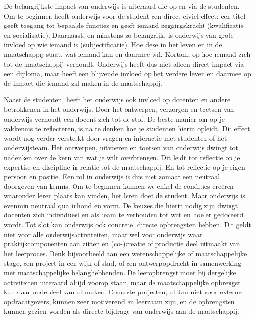 \documentclass{jote-book}
\begin{document}
	De belangrijkste impact van onderwijs is uiteraard die op en via de studenten. Om te beginnen heeft onderwijs voor de student een direct civiel effect: een titel geeft toegang tot bepaalde functies en geeft iemand zeggingskracht (kwalificatie en socialisatie). Daarnaast, en minstens zo belangrijk, is onderwijs van grote invloed op wie iemand is (subjectificatie). Hoe deze in het leven en in de maatschappij staat, wat iemand kan en daarmee wil. Kortom, op hoe iemand zich tot de maatschappij verhoudt. Onderwijs heeft dus niet alleen direct impact via een diploma, maar heeft een blijvende invloed op het verdere leven en daarmee op de impact die iemand zal maken in de maatschappij.



	Naast de studenten, heeft het onderwijs ook invloed op docenten en andere betrokkenen in het onderwijs. Door het ontwerpen, verzorgen en toetsen van onderwijs verhoudt een docent zich tot de stof. De beste manier om op je vakkennis te reflecteren, is na te denken hoe je studenten hierin opleidt. Dit effect wordt nog verder versterkt door vragen en interactie met studenten of het onderwijsteam. Het ontwerpen, uitvoeren en toetsen van onderwijs dwingt tot nadenken over de kern van wat je wilt overbrengen. Dit leidt tot reflectie op je expertise en discipline in relatie tot de maatschappij. En tot reflectie op je eigen persoon en positie. Een rol in onderwijs is dus niet zomaar een neutraal doorgeven van kennis. Om te beginnen kunnen we enkel de condities creëren waaronder leren plaats kan vinden, het leren doet de student. Maar onderwijs is evenmin neutraal qua inhoud en vorm. De keuzes die hierin nodig zijn dwingt docenten zich individueel en als team te verhouden tot wat en hoe er gedoceerd wordt. Tot slot kan onderwijs ook concrete, directe opbrengsten hebben. Dit geldt niet voor alle onderwijsactiviteiten, maar wel voor onderwijs waar praktijkcomponenten aan zitten en (co-)creatie of productie deel uitmaakt van het leerproces. Denk bijvoorbeeld aan een wetenschappelijke of maatschappelijke stage, een project in een wijk of stad, of een ontwerpopdracht in samenwerking met maatschappelijke belanghebbenden. De leeropbrengst moet bij dergelijke activiteiten uiteraard altijd voorop staan, maar de maatschappelijke opbrengst kan daar onderdeel van uitmaken. Concrete projecten, al dan niet voor externe opdrachtgevers, kunnen zeer motiverend en leerzaam zijn, en de opbrengsten kunnen gezien worden als directe bijdrage van onderwijs aan de maatschappij.
\end{document}
